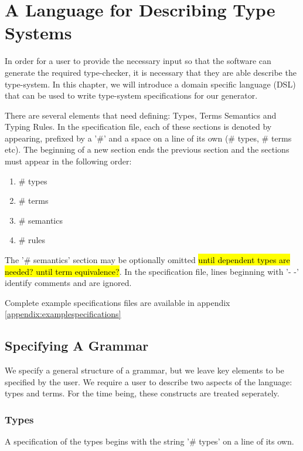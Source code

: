 \chapter{A Language for Describing Type Systems}

In order for a user to provide the necessary input so that the
software can generate the required type-checker, it is necessary that
they are able describe the type-system. In this chapter, we will
introduce a domain specific language (DSL) that can be used to write
type-system specifications for our generator.

There are several elements that need defining: Types, Terms Semantics
and Typing Rules. In the specification file, each of these sections is
denoted by appearing, prefixed by a '\#' and a space on a line of its
own (\# types, \# terms etc). The beginning of a new section ends the
previous section and the sections must appear in the following order:

\begin{enumerate}
  \item \# types
  \item \# terms
  \item \# semantics
  \item \# rules
\end{enumerate}

The '\# semantics' section may be optionally omitted \hl{until
  dependent types are needed? until term equivalence?}. In the
specification file, lines beginning with '- -' identify comments and
are ignored.

Complete example specifications files are available in appendix
\ref{appendix:examplespecifications}

\section{Specifying A Grammar}

We specify a general structure of a grammar, but we leave key elements
to be specified by the user. We require a user to describe two aspects
of the language: types and terms. For the time being, these constructs
are treated seperately.

\subsection{Types}

A specification of the types begins with the string '\# types' on
a line of its own.

